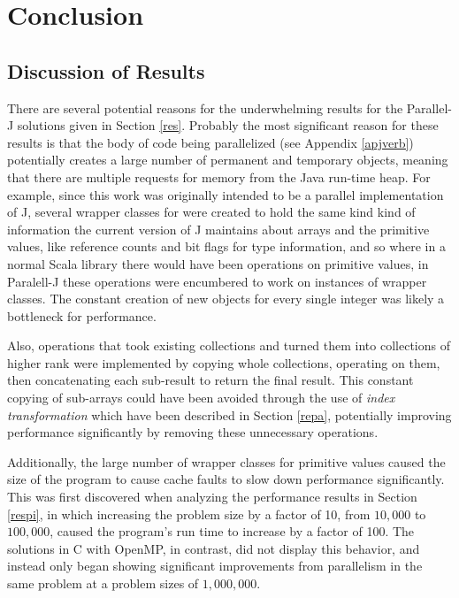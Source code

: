 \chapter{Conclusion}
\label{conc}

\section{Discussion of Results}
\label{discres}
There are several potential reasons for the underwhelming results for the Parallel-J solutions given in Section \ref{res}. 
Probably the most significant reason for these results is that the body of code being parallelized (see Appendix \ref{apjverb}) 
potentially creates a large number of permanent and temporary objects, 
meaning that there are multiple requests for memory from the Java run-time heap. 
For example, since this work was originally intended to be a parallel implementation of J, 
several wrapper classes for were created to hold the same kind kind of information the current version of J\cite{ioj} 
maintains about arrays and the primitive values, like reference counts and bit flags for type information, 
and so where in a normal Scala library there would have been operations on primitive values, 
in Paralell-J these operations were encumbered to work on instances of wrapper classes. 
The constant creation of new objects for every single integer was likely a bottleneck for performance.

Also, operations that took existing collections and turned them into collections of higher rank 
were implemented by copying whole collections, operating on them, 
then concatenating each sub-result to return the final result. 
This constant copying of sub-arrays could have been avoided through the use of \textit{index transformation} 
which have been described in Section \ref{repa}, potentially improving performance significantly 
by removing these unnecessary operations.
 
Additionally, the large number of wrapper classes for primitive values 
caused the size of the program to cause cache faults to slow down performance significantly. 
This was first discovered when analyzing the performance results in Section \ref{respi}, 
in which increasing the problem size by a factor of 10, from $10,000$ to $100,000$, 
caused the program's run time to increase by a factor of 100. 
The solutions in C with OpenMP, in contrast, did not display this behavior, 
and instead only began showing significant improvements from parallelism in the same problem 
at a problem sizes of $1,000,000$.

